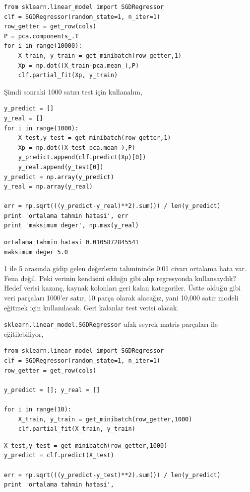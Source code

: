 \documentclass[12pt,fleqn]{article}\usepackage{../../common}
\begin{document}
\begin{verbatim}
from sklearn.linear_model import SGDRegressor
clf = SGDRegressor(random_state=1, n_iter=1)
row_getter = get_row(cols)
P = pca.components_.T
for i in range(10000):
    X_train, y_train = get_minibatch(row_getter,1)
    Xp = np.dot((X_train-pca.mean_),P)
    clf.partial_fit(Xp, y_train)
\end{verbatim}

Şimdi sonraki 1000 satırı test için kullanalım,

\begin{verbatim}
y_predict = []
y_real = []
for i in range(1000):
    X_test,y_test = get_minibatch(row_getter,1)
    Xp = np.dot((X_test-pca.mean_),P)
    y_predict.append(clf.predict(Xp)[0])
    y_real.append(y_test[0])
y_predict = np.array(y_predict)
y_real = np.array(y_real)

err = np.sqrt(((y_predict-y_real)**2).sum()) / len(y_predict)
print 'ortalama tahmin hatasi', err
print 'maksimum deger', np.max(y_real)
\end{verbatim}

\begin{verbatim}
ortalama tahmin hatasi 0.0105872845541
maksimum deger 5.0
\end{verbatim}

1 ile 5 arasında gidip gelen değerlerin tahmininde 0.01 civarı ortalama
hata var. Fena değil. Peki verinin kendisini olduğu gibi alıp regresyonda
kullansaydık? Hedef verisi kazanç, kaynak kolonları geri kalan
kategoriler. Üstte olduğu gibi veri parçaları 1000'er satır, 10 parça
olarak alacağız, yani 10,000 satır modeli eğitmek için kullanılacak. Geri
kalanlar test verisi olacak. 

\verb!sklearn.linear_model.SGDRegressor! ufak seyrek matris parçaları ile
eğitilebiliyor,

\begin{verbatim}
from sklearn.linear_model import SGDRegressor
clf = SGDRegressor(random_state=1, n_iter=1)
row_getter = get_row(cols)

y_predict = []; y_real = []

for i in range(10):
    X_train, y_train = get_minibatch(row_getter,1000)
    clf.partial_fit(X_train, y_train)
\end{verbatim}

\begin{verbatim}
X_test,y_test = get_minibatch(row_getter,1000)
y_predict = clf.predict(X_test) 

err = np.sqrt(((y_predict-y_test)**2).sum()) / len(y_predict)
print 'ortalama tahmin hatasi', 
\end{verbatim}
\end{document}
